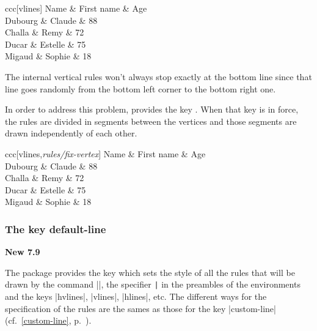 \documentclass[dvipsnames]{article}
\begin{document}
\medskip
{}
\begin{Code}[width=9.5cm,show-output]
\begin{NiceTabular}{ccc}[vlines]
\Hline
  Name & First name & Age \\
\Hline
  Dubourg & Claude & 88 \\
  Challa & Remy & 72 \\
  Ducar & Estelle & 75 \\
  Migaud & Sophie & 18 \\[1mm]
\emph{\RandomLine}
\end{NiceTabular}
\end{Code}

\bigskip
The internal vertical rules won't always stop exactly at the bottom line 
since that line goes randomly from the bottom left corner to the bottom right one.

In order to address this problem,  provides the key
. When that key is in force, the rules are divided
in segments between the vertices and those segments are drawn independently of each other.

\nobreak
\medskip
\begin{Code}[width=9.5cm,show-output]
\begin{NiceTabular}{ccc}[vlines,\emph{rules/fix-vertex}]
\Hline
  Name & First name & Age \\
\Hline
  Dubourg & Claude & 88 \\
  Challa & Remy & 72 \\
  Ducar & Estelle & 75 \\
  Migaud & Sophie & 18 \\[1mm]
\emph{\RandomLine}
\end{NiceTabular}
\end{Code}




\subsubsection{The key default-line}


\colorbox{yellow!50}{\bfseries New 7.9}

\nobreak
\smallskip
The package  provides the key  which
sets the style of all the rules that will be drawn by the command |\Hline|, the
specifier \verb+|+ in the preambles of the environments and the keys |hvlines|,
|vlines|, |hlines|, etc. The different ways for the specification of the rules
are the sames as those for the key |custom-line| (cf.~\ref{custom-line},
p.~\pageref{custom-line}).
\end{document}
